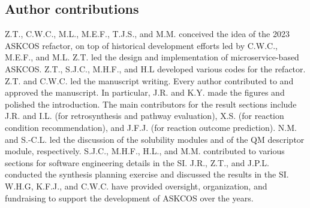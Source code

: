 \documentclass[pdflatex,sn-mathphys-num]{sn-jnl}%
\theoremstyle{thmstyleone}%
\theoremstyle{thmstyletwo}%
\theoremstyle{thmstylethree}%
\begin{document}
\subsection{Author contributions}

Z.T., C.W.C., M.L., M.E.F., T.J.S., and M.M. conceived the idea of the 2023 ASKCOS refactor, on top of historical development efforts led by C.W.C., M.E.F., and M.L. Z.T. led the design and implementation of microservice-based ASKCOS. Z.T., S.J.C., M.H.F., and H.L developed various codes for the refactor. Z.T. and C.W.C. led the manuscript writing. Every author contributed to and approved the manuscript. In particular, J.R. and K.Y. made the figures and polished the introduction. The main contributors for the result sections include J.R. and I.L. (for retrosynthesis and pathway evaluation), X.S. (for reaction condition recommendation), and J.F.J. (for reaction outcome prediction). N.M. and S.-C.L. led the discussion of the solubility modules and of the QM descriptor module, respectively. S.J.C., M.H.F., H.L., and M.M. contributed to various sections for software engineering details in the SI. J.R., Z.T., and J.P.L. conducted the synthesis planning exercise and discussed the results in the SI. W.H.G, K.F.J., and C.W.C. have provided oversight, organization, and fundraising to support the development of ASKCOS over the years. 



\end{document}
